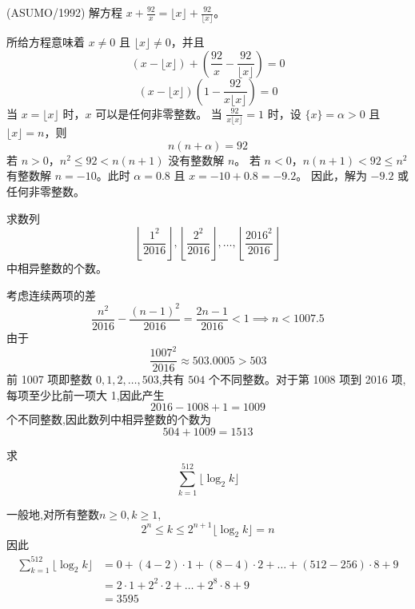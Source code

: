 \begin{questions}
\question (ASUMO/1992) 解方程 $x + \frac{92}{x} = \lfloor x \rfloor + \frac{92}{\lfloor x \rfloor}$。

\begin{solution}
所给方程意味着 $x \ne 0$ 且 $\lfloor x \rfloor \ne 0$，并且
\[
(x - \lfloor x \rfloor) + \left( \frac{92}{x} - \frac{92}{\lfloor x \rfloor} \right) = 0
\]
\[
(x - \lfloor x \rfloor) \left( 1 - \frac{92}{x \lfloor x \rfloor} \right) = 0
\]
当 $x = \lfloor x \rfloor$ 时，$x$ 可以是任何非零整数。
当 $\frac{92}{x \lfloor x \rfloor} = 1$ 时，设 $\{x\} = \alpha > 0$ 且 $\lfloor x \rfloor = n$，则
\[
n(n + \alpha) = 92
\]
若 $n > 0$，$n^2 \le 92 < n(n + 1)$ 没有整数解 $n$。
若 $n < 0$，$n(n + 1) < 92 \le n^2$ 有整数解 $n = -10$。此时 $\alpha = 0.8$ 且 $x = -10 + 0.8 = -9.2$。
因此，解为 $-9.2$ 或任何非零整数。
\end{solution}
    \question 求数列
    \[
    \left\lfloor \frac{1^2}{2016} \right\rfloor, \left\lfloor \frac{2^2}{2016} \right\rfloor, \dots, \left\lfloor \frac{2016^2}{2016} \right\rfloor
    \]
    中相异整数的个数。
    \begin{solution}
        考虑连续两项的差
        \[
        \frac{n^2}{2016} - \frac{(n-1)^2}{2016} = \frac{2n-1}{2016} < 1 \implies n < 1007.5
        \]
        由于
        \[
        \frac{1007^2}{2016} \approx 503.0005 > 503
        \]  
        前 1007 项即整数 $0,1,2,\dots,503$,共有 $504$ 个不同整数。对于第 1008 项到 2016 项,
        每项至少比前一项大 1,因此产生 
        \[
        2016-1008+1 = 1009
        \]
        个不同整数,因此数列中相异整数的个数为
        \[
        504 + 1009 = 1513
        \]
    \end{solution}

    \question 求 
    \[
    \sum_{k=1}^{512} \lfloor \log_2 k \rfloor
    \]
    \begin{solution}
        一般地,对所有整数$n\ge 0,k \ge 1$,
        \[
        2^n \le k \le 2^{n+1} \lfloor \log_2 k \rfloor = n
        \]
        因此
        \begin{align}
        \sum_{k=1}^{512} \lfloor \log_2 k \rfloor &= 0 + (4-2) \cdot 1 + (8-4) \cdot 2 + \dots + (512-256) \cdot 8 + 9 \\
        &= 2 \cdot 1 + 2^2 \cdot 2 + \dots + 2^8 \cdot 8 + 9 \\
        &= 3595
        \end{align}
    \end{solution}


\end{questions}
